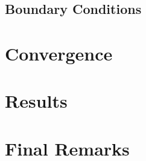 \documentclass{article}
\begin{document}

\subsection{Boundary Conditions}


\section{Convergence}


\section{Results}


\section{Final Remarks}

\FloatBarrier

\nocite{*}
\printbibliography

\end{document}
